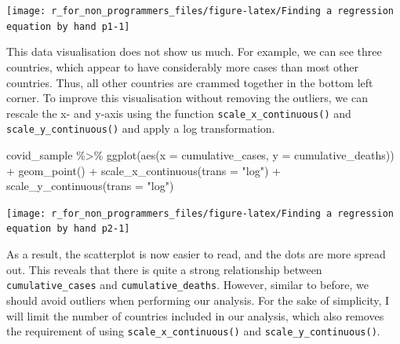 \documentclass[
]{book}
\newenvironment{Shaded}{\begin{snugshade}}{\end{snugshade}}
\newcommand{\AttributeTok}[1]{\textcolor[rgb]{0.77,0.63,0.00}{#1}}
\newcommand{\FunctionTok}[1]{\textcolor[rgb]{0.00,0.00,0.00}{#1}}
\newcommand{\NormalTok}[1]{#1}
\newcommand{\SpecialCharTok}[1]{\textcolor[rgb]{0.00,0.00,0.00}{#1}}
\newcommand{\StringTok}[1]{\textcolor[rgb]{0.31,0.60,0.02}{#1}}
\begin{document}
\begin{center}\texttt{[image: r\_for\_non\_programmers\_files/figure-latex/Finding a regression equation by hand p1-1]} \end{center}

This data visualisation does not show us much. For example, we can see three countries, which appear to have considerably more cases than most other countries. Thus, all other countries are crammed together in the bottom left corner. To improve this visualisation without removing the outliers, we can rescale the x- and y-axis using the function \texttt{scale\_x\_continuous()} and \texttt{scale\_y\_continuous()} and apply a log transformation.

\begin{Shaded}
\begin{Highlighting}[]
\NormalTok{covid\_sample }\SpecialCharTok{\%\textgreater{}\%}
  \FunctionTok{ggplot}\NormalTok{(}\FunctionTok{aes}\NormalTok{(}\AttributeTok{x =}\NormalTok{ cumulative\_cases,}
             \AttributeTok{y =}\NormalTok{ cumulative\_deaths)) }\SpecialCharTok{+}
  \FunctionTok{geom\_point}\NormalTok{() }\SpecialCharTok{+}
  \FunctionTok{scale\_x\_continuous}\NormalTok{(}\AttributeTok{trans =} \StringTok{"log"}\NormalTok{) }\SpecialCharTok{+}
  \FunctionTok{scale\_y\_continuous}\NormalTok{(}\AttributeTok{trans =} \StringTok{"log"}\NormalTok{)}
\end{Highlighting}
\end{Shaded}

\begin{center}\texttt{[image: r\_for\_non\_programmers\_files/figure-latex/Finding a regression equation by hand p2-1]} \end{center}

As a result, the scatterplot is now easier to read, and the dots are more spread out. This reveals that there is quite a strong relationship between \texttt{cumulative\_cases} and \texttt{cumulative\_deaths}. However, similar to before, we should avoid outliers when performing our analysis. For the sake of simplicity, I will limit the number of countries included in our analysis, which also removes the requirement of using \texttt{scale\_x\_continuous()} and \texttt{scale\_y\_continuous()}.
\end{document}
